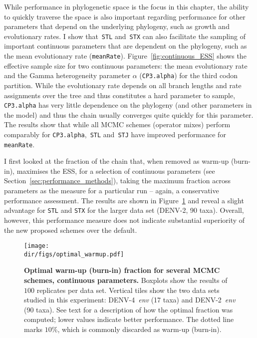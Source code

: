 While performance in phylogenetic space is the focus in this chapter, the ability to quickly traverse the space is also important regarding performance for other parameters that depend on the underlying phylogeny, such as growth and evolutionary rates.
I show that~\verb|STL| and~\verb|STX| can also facilitate the sampling of important continuous parameters that are dependent on the phylogeny, such as the mean evolutionary rate (\verb|meanRate|).
Figure~\ref{fig:continuous_ESS} shows the effective sample size for two continuous parameters: the mean evolutionary rate and the Gamma heterogeneity parameter $\alpha$  (\verb|CP3.alpha|) for the third codon partition.
While the evolutionary rate depends on all branch lengths and rate assignments over the tree and thus constitutes a hard parameter to sample, \verb|CP3.alpha| has very little dependence on the phylogeny (and other parameters in the model) and thus the chain usually converges quite quickly for this parameter.
The results show that while all MCMC schemes (operator mixes) perform comparably for \verb|CP3.alpha|,~\verb|STL| and~\verb|STJ| have improved performance for \verb|meanRate|.

I first looked at the fraction of the chain that, when removed as warm-up (burn-in), maximises the ESS, for a selection of continuous parameters (see Section~\ref{sec:performance_methods}), taking the maximum fraction across parameters as the measure for a particular run -- again, a conservative performance assessment.
The results are shown in Figure~\ref{fig:optimal_burnin} and reveal a slight advantage for \verb|STL| and \verb|STX| for the larger data set (DENV-2, 90 taxa).
Overall, however, this performance measure does not indicate substantial superiority of the new proposed schemes over the default.

\begin{figure}[!ht]
\begin{center}
\texttt{[image: \\dir/figs/optimal\_warmup.pdf]} 
\end{center}
 \caption[Optimal warm-up (burn-in) fraction for several MCMC schemes, continuous parameters.]{\textbf{Optimal warm-up (burn-in) fraction for several MCMC schemes, continuous parameters.}
   Boxplots show the results of $100$ replicates per data set.
  Vertical tiles show the two data sets studied in this experiment: DENV-4~\textit{env} (17 taxa) and DENV-2~\textit{env} (90 taxa).
  See text for a description of how the optimal fraction was computed; lower values indicate better performance.
  The dotted line marks $10\%$, which is commonly discarded as warm-up (burn-in).
  }
 \label{fig:optimal_burnin}
\end{figure}

